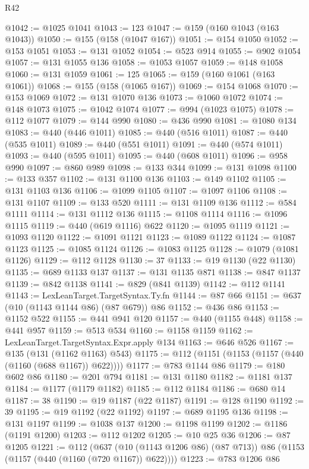 \begin{lexlean}{R42}
\begin{coremodule}
@1042 := @1025 @1041
@1043 := 123
@1047 := @159 (@160 @1043 (@163 @1043))
@1050 := @155 (@158 (@1047 @167))
@1051 := @154 @1050
@1052 := @153 @1051
@1053 := @131 @1052
@1054 := @523 @914
@1055 := @902 @1054
@1057 := @131 @1055 @136
@1058 := @1053 @1057
@1059 := @148 @1058
@1060 := @131 @1059
@1061 := 125
@1065 := @159 (@160 @1061 (@163 @1061))
@1068 := @155 (@158 (@1065 @167))
@1069 := @154 @1068
@1070 := @153 @1069
@1072 := @131 @1070 @136
@1073 := @1060 @1072
@1074 := @148 @1073
@1075 := @1042 @1074
@1077 := @994 (@1023 @1075)
@1078 := @112 @1077
@1079 := @144 @990
@1080 := @436 @990
@1081 := @1080 @134
@1083 := @440 (@446 @1011)
@1085 := @440 (@516 @1011)
@1087 := @440 (@535 @1011)
@1089 := @440 (@551 @1011)
@1091 := @440 (@574 @1011)
@1093 := @440 (@595 @1011)
@1095 := @440 (@608 @1011)
@1096 := @958 @990
@1097 := @860 @989
@1098 := @133 @344
@1099 := @131 @1098
@1100 := @133 @357
@1102 := @131 @1100 @136
@1103 := @149 @1102
@1105 := @131 @1103 @136
@1106 := @1099 @1105
@1107 := @1097 @1106
@1108 := @131 @1107
@1109 := @133 @520
@1111 := @131 @1109 @136
@1112 := @584 @1111
@1114 := @131 @1112 @136
@1115 := @1108 @1114
@1116 := @1096 @1115
@1119 := @440 (@619 @1116) @622
@1120 := @1095 @1119
@1121 := @1093 @1120
@1122 := @1091 @1121
@1123 := @1089 @1122
@1124 := @1087 @1123
@1125 := @1085 @1124
@1126 := @1083 @1125
@1128 := @1079 (@1081 @1126)
@1129 := @112 @1128
@1130 := 37
@1133 := @19 @1130 (@22 @1130)
@1135 := @689 @1133 @137
@1137 := @131 @1135 @871
@1138 := @847 @1137
@1139 := @842 @1138
@1141 := @829 (@841 @1139)
@1142 := @112 @1141
@1143 := LexLeanTarget.TargetSyntax.Ty.fn
@1144 := @87 @66
@1151 := @637 (@10 (@1143 @1144 @86) (@87 @679)) @86
@1152 := @436 @86
@1153 := @1152 @522
@1155 := @441 @941 @120
@1157 := @440 (@1155 @448)
@1158 := @441 @957
@1159 := @513 @534
@1160 := @1158 @1159
@1162 := LexLeanTarget.TargetSyntax.Expr.apply @134
@1163 := @646 @526
@1167 := @135 (@131 (@1162 @1163) @543)
@1175 := @112 (@1151 (@1153 (@1157 (@440 (@1160 (@688 @1167)) @622))))
@1177 := @783 @1144 @86
@1179 := @180 @602 @86
@1180 := @201 @794
@1181 := @131 @1180
@1182 := @1181 @137
@1184 := @1177 (@1179 @1182)
@1185 := @112 @1184
@1186 := @680 @14
@1187 := 38
@1190 := @19 @1187 (@22 @1187)
@1191 := @128 @1190
@1192 := 39
@1195 := @19 @1192 (@22 @1192)
@1197 := @689 @1195 @136
@1198 := @131 @1197
@1199 := @1038 @137
@1200 := @1198 @1199
@1202 := @1186 (@1191 @1200)
@1203 := @112 @1202
@1205 := @10 @25 @36
@1206 := @87 @1205
@1221 := @112
    (@637 (@10 (@1143 @1206 @86) (@87 @713)) @86 (@1153 (@1157 (@440 (@1160 (@720 @1167)) @622))))
@1223 := @783 @1206 @86

\end{coremodule}
\end{lexlean}
